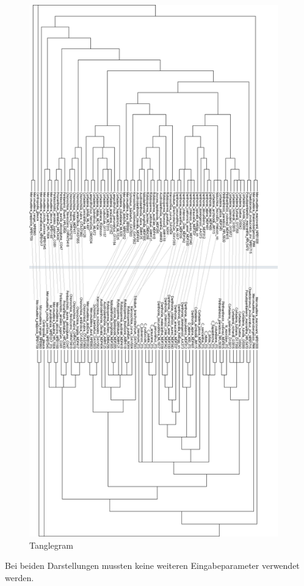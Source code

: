 \documentclass[a4paper,12pt,ngerman]{scrartcl}
\begin{document}
\begin{figure}[ht]
    \centering
    \includegraphics[height=23cm]{includes/Tanglegram}
    \caption{Tanglegram}
    \label{fig:tanglegram}
\end{figure}

Bei beiden Darstellungen mussten keine weiteren Eingabeparameter verwendet werden.
\end{document}
